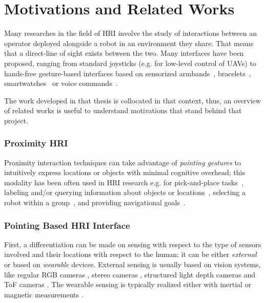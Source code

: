 \section*{Motivations and Related Works} \label{sec:related}
Many researches in the field of \ac{HRI} involve the study of interactions between an operator deployed alongside a robot in an environment they share. That means that a direct-line of sight exists between the two. Many interfaces have been proposed, ranging from standard joysticks (e.g. for low-level control of \acs{UAV}s) to hands-free gesture-based interfaces based on sensorized armbands~\cite{Wolf2013}, bracelets~\cite{Cacace2016,gromov2018video}, smartwatches~\cite{Villani2017} or voice commands~\cite{Gromov2016}.

The work developed in that thesis is collocated in that context, thus, an overview of related works is useful to understand motivations that stand behind that project.

\subsubsection*{Proximity HRI}
Proximity interaction techniques can take advantage of \emph{pointing gestures} to intuitively express locations or objects with minimal cognitive overhead; this modality has been often used in \ac{HRI} research e.g. for pick-and-place tasks~\cite{Brooks2006,Droeschel2011,Grossmann2014,Cosgun2015}, labeling and/or querying information about objects or locations~\cite{Brooks2006,Pateraki2014,Akkil2016}, selecting a robot within a group~\cite{Nagi2014a,Pourmehr2013}, and providing navigational goals~\cite{VanDenBergh2011,Abidi2013,Wolf2013,Jevtic2015,Gromov2016,Tolgyessy2017,gromov2018video}.

\subsubsection*{Pointing Based HRI Interface}
First, a differentiation can be made on sensing with respect to the type of sensors involved and their locations with respect to the human: it can be either \emph{external} or based on \emph{wearable} devices.
External sensing is usually based on vision systems, like regular \acs{RGB} cameras \cite{Pateraki2014,Monajjemi2016}, stereo cameras \cite{Nickel2003}, structured light depth cameras \cite{Cosgun2015} and \ac{ToF} cameras \cite{Droeschel2011}. The wearable sensing is typically realized either with inertial \cite{Wolf2013,Sugiyama2013} or magnetic measurements \cite{Bolt1980,Nickel2003}. 

